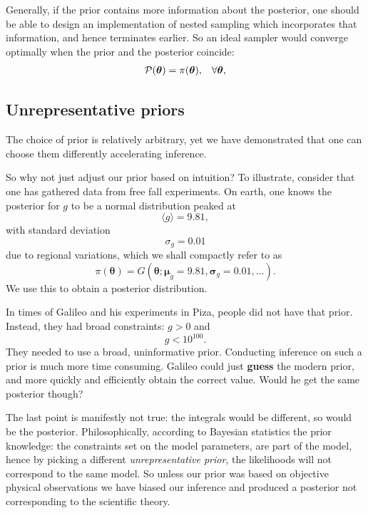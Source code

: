 \documentclass[usenatbib]{mnras}
\begin{document}
Generally, if the prior contains more information about the
posterior, one should be able to design an implementation of nested
sampling which incorporates that information, and hence terminates
earlier.  So an ideal sampler would converge optimally when the
prior and the posterior coincide:
\begin{equation}
\begin{array}{rl} 
{\cal P}(\bm{\theta}) = \pi(\bm{\theta}), & \forall \bm{\theta},
\end{array}
\end{equation}

\subsection{Unrepresentative priors\label{discussion-bias}}
The choice of prior is relatively arbitrary, yet we have
demonstrated that one can choose them differently accelerating
inference.

So why not just adjust our prior based on intuition?  To illustrate,
consider that one has gathered data from free fall experiments. On
earth, one knows the posterior for \(g\) to be a normal distribution
peaked at \[\langle g \rangle=9.81,\] with standard
deviation \[\sigma_{g} = 0.01\] due to regional variations, which we
shall compactly refer to as
\begin{equation*}
  \pi(\bm{\theta}) = G(\bm{\theta};\bm{\mu}_{g}=9.81, \bm{\sigma}_{g}=0.01, \ldots ).
\end{equation*}
We use this to obtain a posterior distribution.

In times of Galileo and his experiments in Piza, people did not
have that prior. Instead, they had broad constraints: \(g>0\) and
\[g<10^{100}.\] They needed to use a broad, uninformative
prior. Conducting inference on such a prior is much more time
consuming. Galileo could just \textbf{guess} the modern prior, and more
quickly and efficiently obtain the correct value. Would he get the
same posterior though?

The last point is manifestly not true: the integrals would be
different, so would be the posterior. Philosophically, according to
Bayesian statistics the prior knowledge: the constraints set on the
model parameters, are part of the model, hence by picking a
different \emph{unrepresentative prior}, the likelihoods will not
correspond to the same model. So unless our prior was based on
objective physical observations we have biased our inference and
produced a posterior not corresponding to the scientific theory.
\end{document}
